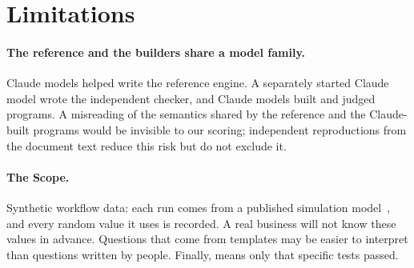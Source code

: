 \section{Limitations}
\label{sec:limits}

\paragraph{The reference and the builders share a model family.} Claude models helped write the reference engine. A separately started Claude model wrote the independent checker, and Claude models built and judged programs. A misreading of the semantics shared by the reference and the Claude-built programs would be invisible to our scoring; independent reproductions from the document text reduce this risk but do not exclude it.

\paragraph{The Scope.} Synthetic workflow data: each run comes from a published simulation model~\cite{chapela2023zenodo}, and every random value it uses is recorded. A real business will not know these values in advance. Questions that come from templates may be easier to interpret than questions written by people. Finally, \Trusted means only that specific tests passed.
